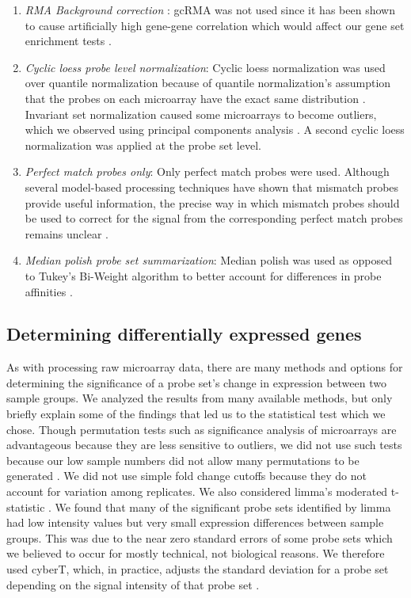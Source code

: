 \begin{enumerate}
  \item \emph{RMA Background correction} \cite{Irizarry:2003ge}: 
  gcRMA\cite{Wu:2004wh} was not used since it
  has been shown to cause artificially high gene-gene correlation which
  would affect our gene set enrichment tests \cite{Lim:2007gc}.
  
  \item \emph{Cyclic loess probe level normalization}: Cyclic loess normalization was 
  used over quantile normalization because of quantile normalization's assumption
  that the probes on each microarray have the exact same 
  distribution \cite{Ballman:2004ee}. Invariant
  set normalization caused some microarrays to become outliers, which we observed
  using principal components analysis \cite{Li:2001wk}. A second cyclic loess normalization was applied
  at the probe set level.
  
  \item \emph{Perfect match probes only}: Only perfect match probes were used.
  Although several model-based processing techniques have shown that mismatch
  probes provide useful information, the precise way in which mismatch probes should
  be used to correct for the signal from the corresponding perfect match 
  probes remains unclear \cite{Wang:2007dy}.
  
  \item \emph{Median polish probe set summarization}: Median polish was 
  used as opposed to Tukey's Bi-Weight algorithm to better account for 
  differences in probe affinities \cite{Tukey:1977uy, Affymetrix:2002vh}.
    
\end{enumerate}

\subsection{Determining differentially expressed genes}\label{S:DE}

As with processing raw microarray data, there are many methods and options
for determining the significance of a probe set's change in expression between
two sample groups. We analyzed the results from many available methods, but only
briefly explain some of the findings that led us to the statistical test 
which we chose. Though permutation tests such as significance analysis of
microarrays are advantageous because they are less sensitive to outliers,
we did not use such tests because our low sample numbers did not allow
many permutations to be generated \cite{Tusher:2001kk}. We did not use 
simple fold change cutoffs because
they do not account for variation among replicates. We also considered limma's 
moderated t-statistic \cite{Smyth:2004gh}. We found
that many of the significant probe sets identified by limma had low intensity values but very
small expression differences between sample groups. This was due to the near zero standard 
errors of some probe sets which we believed to occur for mostly technical,
not biological reasons. We therefore used cyberT, which, in practice,
adjusts the standard deviation for a probe set depending on the signal intensity
of that probe set \cite{Baldi:2001ul}.

